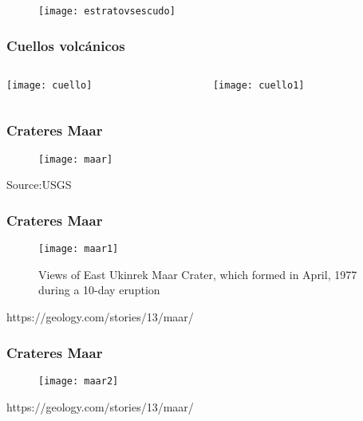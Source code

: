\documentclass{beamer}
\begin{document}
\begin{frame}
\begin{figure}
\begin{center}
\texttt{[image: estratovsescudo]}
\end{center}
\end{figure}
\end{frame}
\begin{frame}
\frametitle{Cuellos volcánicos}
\begin{columns}
	\begin{column}{.5\linewidth}
	\begin{center}
	\texttt{[image: cuello]}
	\end{center}
	\end{column}
	\begin{column}{.5\linewidth}
	\begin{center}
	\texttt{[image: cuello1]}\vfill
	\end{center}
	\end{column}
\end{columns}
\end{frame}
\begin{frame}
\frametitle{Crateres Maar}
\begin{figure}
\begin{center}
\texttt{[image: maar]}
\end{center}
\end{figure}
\tiny{Source:USGS}
\end{frame}
\begin{frame}
\frametitle{Crateres Maar}
\begin{figure}
\begin{center}
\texttt{[image: maar1]}
\end{center}
\caption{Views of East Ukinrek Maar Crater, which formed in April, 1977 during a 10-day eruption}
\end{figure}
\tiny{https://geology.com/stories/13/maar/}
\end{frame}
\begin{frame}
\frametitle{Crateres Maar}
\begin{figure}
\begin{center}
\texttt{[image: maar2]}
\end{center}
\end{figure}
\tiny{https://geology.com/stories/13/maar/}
\end{frame}
\end{document}
